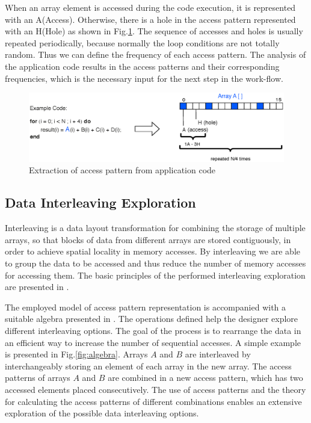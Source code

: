 \documentclass[prodmode,acmtecs]{acmsmall}
\begin{document}
When an array element is accessed during the code execution, it is represented with an A(Access).
Otherwise, there is a hole in the access pattern represented with an H(Hole) as shown in Fig.\ref{fig:pattern}.
The sequence of accesses and holes is usually repeated periodically, because normally the loop conditions are not totally random.
Thus we can define the frequency of each access pattern.
The analysis of the application code results in the access patterns and their corresponding frequencies, which is the necessary input for the next step in the work-flow.

\begin{figure}
\centering
	\includegraphics[scale = 0.6]{Images/AHpattern.eps} 
	\caption{Extraction of access pattern from application code}
	\label{fig:pattern}
\end{figure}


\subsection{Data Interleaving Exploration}
Interleaving is a data layout transformation for combining the storage of multiple arrays, so that blocks of data from different arrays are stored contiguously, in order to achieve spatial locality in memory accesses.
By interleaving we are able to group the data to be accessed and thus reduce the number of memory accesses for accessing them.
The basic principles of the performed interleaving exploration are presented in \cite{sharma2013data}.

The employed model of access pattern representation is accompanied with a suitable algebra presented in \cite{kritikakou2013phd}.
The operations defined help the designer explore different interleaving options.
The goal of the process is to rearrange the data in an efficient way to increase the number of sequential accesses.
A simple example is presented in Fig.\ref{fig:algebra}.
Arrays $A$ and $B$ are interleaved by interchangeably storing an element of each array in the new array. 
The access patterns of arrays $A$ and $B$ are combined in a new access pattern, which has two accessed elements placed consecutively.
The use of access patterns and the theory for calculating the access patterns of different combinations enables an extensive exploration of the possible data interleaving options.
\end{document}
